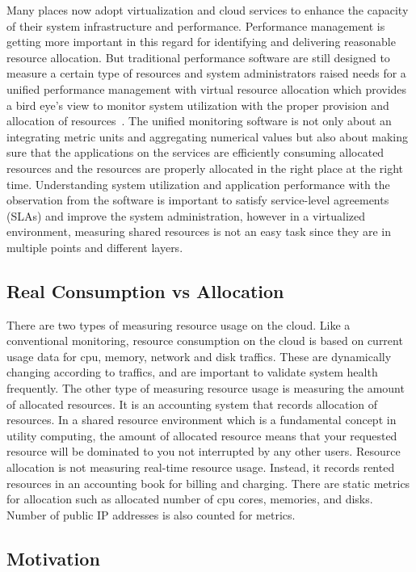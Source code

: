\documentclass{sig-alternate-05-2015}
\begin{document}
Many places now adopt virtualization and cloud services to enhance the capacity of their system infrastructure and performance. Performance management is getting more important in this regard for identifying and delivering reasonable resource allocation. But traditional performance software are still designed to measure a certain type of resources and system administrators raised needs for a unified performance management with virtual resource allocation which provides a bird eye's view to monitor system utilization with the proper provision and allocation of resources~\cite{Habibzai12}. The unified monitoring software is not only about an integrating metric units and aggregating numerical values but also about making sure that the applications on the services are efficiently consuming allocated resources and the resources are properly allocated in the right place at the right time. Understanding system utilization and application performance with the observation from the software is important to satisfy service-level agreements (SLAs) and improve the system administration, however in a virtualized environment, measuring shared resources is not an easy task since they are in multiple points and different layers. 


\subsection{Real Consumption vs Allocation}
There are two types of measuring resource usage on the cloud. Like a conventional monitoring, resource consumption on the cloud is based on current usage data for cpu, memory, network and disk traffics. These are dynamically changing according to traffics, and are important to validate system health frequently. The other type of measuring resource usage is measuring the amount of allocated resources. It is an accounting system that records allocation of resources. In a shared resource environment which is a fundamental concept in utility computing, the amount of allocated resource means that your requested resource will be dominated to you not interrupted by any other users. Resource allocation is not measuring real-time resource usage. Instead, it records rented resources in an accounting book for billing and charging. There are static metrics for allocation such as allocated number of cpu cores, memories, and disks. Number of public IP addresses is also counted for metrics.

\subsection{Motivation}
\end{document}
